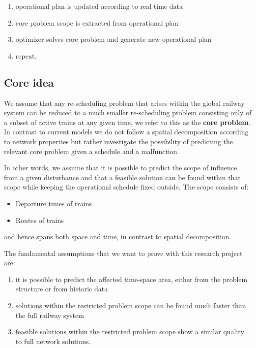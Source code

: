 \documentclass{article}
\begin{document}
\begin{enumerate}
    \item operational plan is updated according to real time data
    \item core problem scope is extracted from operational plan
    \item optimizer solves core problem and generate new operational plan
    \item repeat.
\end{enumerate}

\subsection{Core idea}\label{subsec:coreidea}

We assume that any re-scheduling problem that arises within the global railway system can be reduced to a much smaller re-scheduling problem consisting only of a subset of active trains at any given time, we refer to this as the \textbf{core problem}. In contrast to current models we do not follow a spatial decomposition according to network properties but rather investigate the possibility of predicting the relevant core problem given a schedule and a malfunction.

In other words, we assume that it is possible to predict the scope of influence from a given disturbance and that a feasible solution can be found within that scope while keeping the operational schedule fixed outside. The scope consists of:
\begin{itemize}
    \item Departure times of trains
    \item Routes of trains
\end{itemize}
and hence spans both space and time, in contrast to spatial decomposition.


The fundamental assumptions that we want to prove with this research project are:

\begin{enumerate}
\item it is possible to predict the affected time-space area, either from the problem structure or from historic data
\item solutions within the restricted problem scope can be found much faster than the full railway system
\item feasible solutions within the restricted problem scope show a similar quality to full network solutions.
\end{enumerate}
\end{document}
